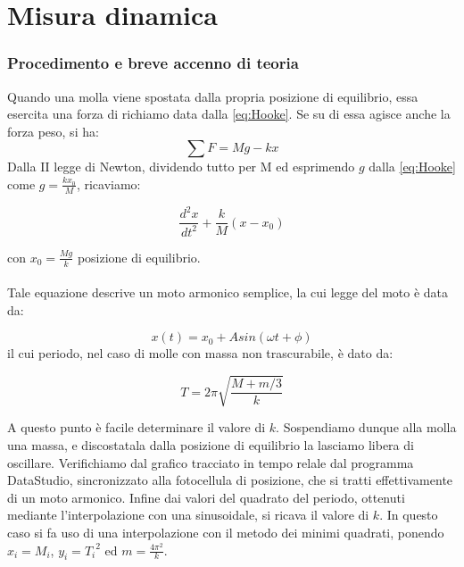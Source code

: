\begin{center}
\begin{tabular}{c c}
\end{tabular}


\end{center}



\section{Misura dinamica}

\subsubsection{Procedimento e breve accenno di teoria}

Quando una molla viene spostata dalla propria posizione di equilibrio, essa esercita una forza di richiamo data dalla \ref{eq:Hooke}. Se su di essa agisce anche la forza peso, si ha:
$$\displaystyle\sum{F}=Mg-kx$$
Dalla II legge di Newton, dividendo tutto per M ed esprimendo $g$ dalla \ref{eq:Hooke} come $g=\displaystyle{\frac{kx_0}{M}}$, ricaviamo:

\begin{equation}
\frac{d^2x}{dt^2}+\frac{k}{M}(x-x_0)
\end{equation}

con $x_0=\displaystyle{\frac{Mg}{k}}$ posizione di equilibrio.\\
\\
Tale equazione descrive un moto armonico semplice, la cui legge del moto è data da:

\begin{equation}\label{eqmoto}
x(t)=x_0+Asin(\omega t+\phi)
\end{equation} 
il cui periodo, nel caso di molle con massa non trascurabile, è dato da:

\begin{equation}\label{periodo}
T=2\pi\sqrt{\frac{M+m/3}{k}}
\end{equation}  

A questo punto è facile determinare il valore di $k$. Sospendiamo dunque alla molla una massa, e discostatala dalla posizione di equilibrio la lasciamo libera di oscillare. Verifichiamo dal grafico tracciato in tempo relale dal programma DataStudio, sincronizzato alla fotocellula di posizione, che si tratti effettivamente di un moto armonico. Infine dai valori del quadrato del periodo, ottenuti mediante l'interpolazione con una sinusoidale, si ricava il valore di $k$. In questo caso si fa uso di una interpolazione con il metodo dei minimi quadrati, ponendo $x_i=M_i$, $y_i={T_i}^2$ ed $m=\displaystyle{\frac{4\pi^2}{k}}$. 

